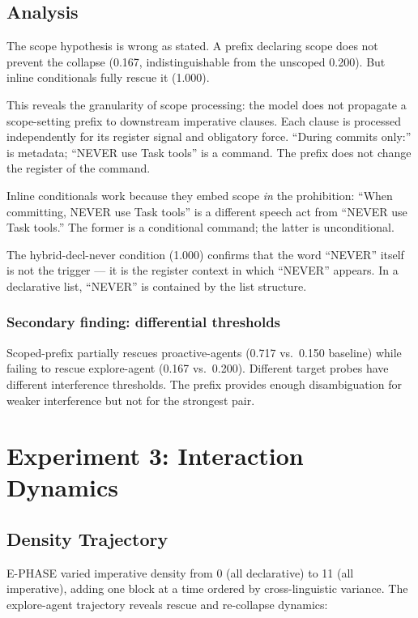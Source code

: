 \documentclass[11pt,a4paper]{article}
\begin{document}
\subsection{Analysis}

The scope hypothesis is wrong as stated. A prefix declaring scope
does not prevent the collapse (0.167, indistinguishable from the
unscoped 0.200). But inline conditionals fully rescue it (1.000).

This reveals the granularity of scope processing: the model does not
propagate a scope-setting prefix to downstream imperative clauses.
Each clause is processed independently for its register signal and
obligatory force. ``During commits only:'' is metadata;
``NEVER use Task tools'' is a command. The prefix does not change
the register of the command.

Inline conditionals work because they embed scope \emph{in} the
prohibition: ``When committing, NEVER use Task tools'' is a different
speech act from ``NEVER use Task tools.'' The former is a conditional
command; the latter is unconditional.

The hybrid-decl-never condition (1.000) confirms that the word
``NEVER'' itself is not the trigger --- it is the register context
in which ``NEVER'' appears. In a declarative list, ``NEVER'' is
contained by the list structure.

\subsubsection{Secondary finding: differential thresholds}

Scoped-prefix partially rescues proactive-agents (0.717 vs.\ 0.150
baseline) while failing to rescue explore-agent (0.167 vs.\ 0.200).
Different target probes have different interference thresholds. The
prefix provides enough disambiguation for weaker interference but
not for the strongest pair.

\section{Experiment 3: Interaction Dynamics}
\label{sec:dynamics}

\subsection{Density Trajectory}

E-PHASE varied imperative density from 0 (all declarative) to 11
(all imperative), adding one block at a time ordered by
cross-linguistic variance. The explore-agent trajectory reveals
rescue and re-collapse dynamics:
\end{document}
